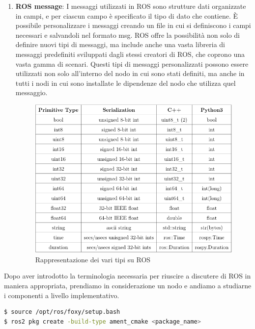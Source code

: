 \begin{enumerate}
\item \textbf{ROS message}:  I messaggi utilizzati in ROS sono strutture dati organizzate in campi, e per ciascun campo è specificato il tipo di dato che contiene. È possibile personalizzare i messaggi creando un file in cui si definiscono i campi necessari e salvandoli nel formato msg. ROS offre la possibilità non solo di definire nuovi tipi di messaggi, ma include anche una vasta libreria di messaggi predefiniti sviluppati dagli stessi creatori di  ROS, che coprono una vasta gamma di scenari. Questi tipi di messaggi personalizzati possono essere utilizzati non solo all’interno del nodo in cui sono stati definiti, ma anche in tutti i nodi in cui sono installate le dipendenze del nodo che utilizza quel messaggio.\\

\begin{figure}[t!]
\centering
\includegraphics[width=\linewidth]{"images/tipi.png"}
\caption{Rappresentazione dei vari tipi su ROS}
\label{fig:myImageLabel}
\end{figure}
\end{enumerate}

Dopo aver introdotto la terminologia necessaria per riuscire a discutere di ROS
 in maniera appropriata, prendiamo in considerazione un nodo e andiamo a studiarne i
 componenti a livello implementativo.
\begin{lstlisting}[language=bash, caption={Creazione di un nodo ROS}]
$ source /opt/ros/foxy/setup.bash
$ ros2 pkg create -build-type ament_cmake <package_name>
\end{lstlisting}

